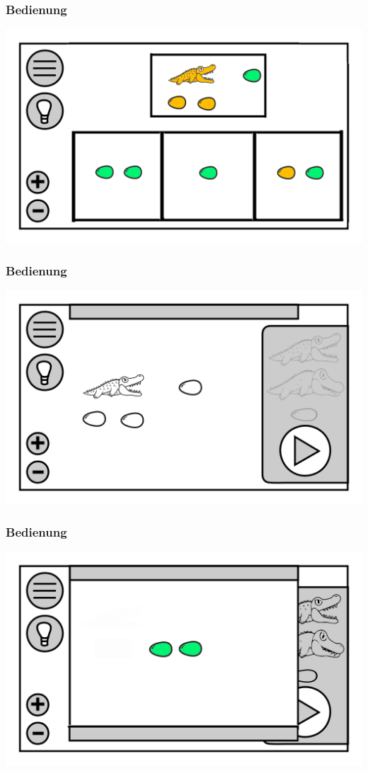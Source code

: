 \documentclass[t]{beamer}
\begin{document}
\begin{frame}
	\frametitle{Bedienung}
	\includegraphics[height=\textheight]{level_choice.png}
\end{frame}
\begin{frame}
	\frametitle{Bedienung}
	\includegraphics[height=\textheight]{level_white.png}
\end{frame}
\begin{frame}
	\frametitle{Bedienung}
	\includegraphics[height=\textheight]{level_end.png}
\end{frame}
\end{document}
